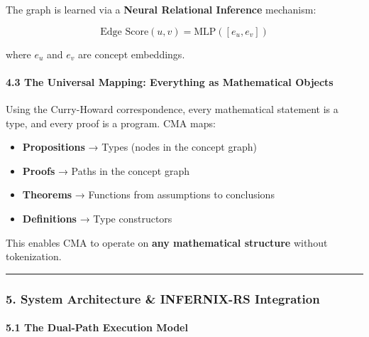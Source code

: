 \documentclass[
  11pt,
  a4paper,
]{article}
\providecommand{\tightlist}{%
  \setlength{\itemsep}{0pt}\setlength{\parskip}{0pt}}
\begin{document}
The graph is learned via a \textbf{Neural Relational Inference}
mechanism:

\[\text{Edge Score}(u, v) = \text{MLP}([e_u, e_v])\]

where \(e_u\) and \(e_v\) are concept embeddings.

\paragraph{4.3 The Universal Mapping: Everything as Mathematical
Objects}\label{the-universal-mapping-everything-as-mathematical-objects}

Using the Curry-Howard correspondence, every mathematical statement is a
type, and every proof is a program. CMA maps:

\begin{itemize}
\tightlist
\item
  \textbf{Propositions} → Types (nodes in the concept graph)
\item
  \textbf{Proofs} → Paths in the concept graph
\item
  \textbf{Theorems} → Functions from assumptions to conclusions
\item
  \textbf{Definitions} → Type constructors
\end{itemize}

This enables CMA to operate on \textbf{any mathematical structure}
without tokenization.

\begin{center}\rule{0.5\linewidth}{0.5pt}\end{center}

\subsubsection{5. System Architecture \& INFERNIX-RS
Integration}\label{system-architecture-infernix-rs-integration}

\paragraph{5.1 The Dual-Path Execution
Model}\label{the-dual-path-execution-model}
\end{document}
